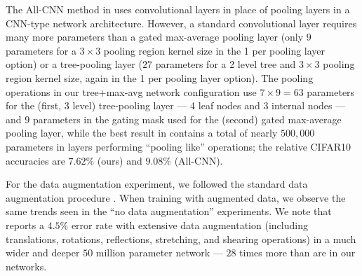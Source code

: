 \documentclass[twoside]{article}
\begin{document}
The All-CNN method in \cite{springenberg2015striving} uses convolutional layers 
in place of pooling layers in a CNN-type network architecture. However, a standard 
convolutional layer requires many more parameters than a gated max-average pooling 
layer (only $9$ parameters for a $3 \times 3$ pooling region kernel size in the 1 
per pooling layer option) or a tree-pooling layer ($27$ parameters for a 2 level 
tree and $3 \times 3$ pooling region kernel size, again in the 1 per pooling layer 
option).  The pooling operations in our tree+max-avg network configuration use $7\times9 = 63$ 
parameters for the (first, 3 level) tree-pooling layer --- 4 leaf nodes and 3 internal 
nodes --- and $9$ parameters in the gating mask used for the (second) gated max-average pooling 
layer, while the best result in \cite{springenberg2015striving} contains a total 
of nearly $500,000$ parameters in layers performing ``pooling like'' operations; 
the relative CIFAR10 accuracies are $7.62\%$ (ours) and $9.08\%$ (All-CNN). 

For the data augmentation experiment, we followed the standard data augmentation procedure 
\cite{lin2013network,lee2015deeply,springenberg2015striving}.
When training with augmented data, we observe the same trends seen in the ``no data augmentation'' experiments.
We note that \cite{graham2014fractional} reports a $4.5\%$ error rate with extensive
data augmentation (including translations, rotations, reflections, stretching, and
shearing operations) in a much wider and deeper $50$ million parameter network
--- $28$ times more than are in our networks.
\end{document}
